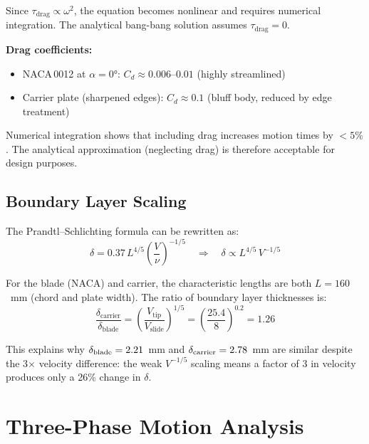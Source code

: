 \documentclass[11pt,a4paper]{article}
\begin{document}
Since $\tau_\mathrm{drag} \propto \omega^2$, the equation becomes nonlinear and
requires numerical integration. The analytical bang-bang solution assumes
$\tau_\mathrm{drag} = 0$.

\textbf{Drag coefficients:}
\begin{itemize}[nosep]
  \item NACA\,0012 at $\alpha = 0°$: $C_d \approx 0.006$--$0.01$ (highly streamlined)
  \item Carrier plate (sharpened edges): $C_d \approx 0.1$ (bluff body, reduced by edge treatment)
\end{itemize}

Numerical integration shows that including drag increases motion times by $<5\%$.
The analytical approximation (neglecting drag) is therefore acceptable for design purposes.

\subsection{Boundary Layer Scaling}

The Prandtl--Schlichting formula can be rewritten as:
\begin{equation}
  \delta = 0.37 \, L^{4/5} \left(\frac{V}{\nu}\right)^{-1/5}
  \quad \Rightarrow \quad
  \delta \propto L^{4/5} \, V^{-1/5}
  \label{eq:delta-scaling}
\end{equation}

For the blade (NACA) and carrier, the characteristic lengths are both $L = 160$~mm
(chord and plate width). The ratio of boundary layer thicknesses is:
\begin{equation}
  \frac{\delta_\mathrm{carrier}}{\delta_\mathrm{blade}}
    = \left(\frac{V_\mathrm{tip}}{V_\mathrm{slide}}\right)^{1/5}
    = \left(\frac{25.4}{8}\right)^{0.2}
    = 1.26
\end{equation}

This explains why $\delta_\mathrm{blade} = 2.21$~mm and
$\delta_\mathrm{carrier} = 2.78$~mm are similar despite the 3$\times$
velocity difference: the weak $V^{-1/5}$ scaling means a factor of 3 in velocity
produces only a 26\% change in $\delta$.


\section{Three-Phase Motion Analysis}
\label{sec:phases}
\end{document}
